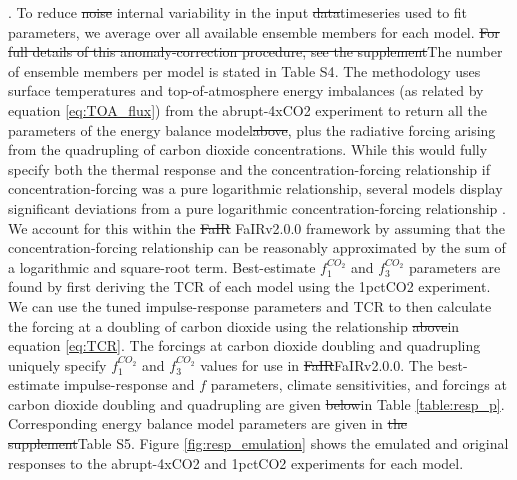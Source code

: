 \documentclass[gmd, manuscript]{copernicus}
\providecommand{\DIFadd}[1]{{\protect\color{blue}#1}} %
\providecommand{\DIFdel}[1]{{\protect\color{red}\sout{#1}}}                      %
\providecommand{\DIFaddbegin}{} %
\providecommand{\DIFaddend}{} %
\providecommand{\DIFdelbegin}{} %
\providecommand{\DIFdelend}{} %
\begin{document}
{}\DIFaddend . To reduce \DIFdelbegin \DIFdel{noise }\DIFdelend \DIFaddbegin \DIFadd{internal variability }\DIFaddend in the input \DIFdelbegin \DIFdel{data}\DIFdelend \DIFaddbegin \DIFadd{timeseries used to fit parameters}\DIFaddend , we average over all available ensemble members for each model. \DIFdelbegin \DIFdel{For full details of this anomaly-correction procedure, see the supplement}\DIFdelend \DIFaddbegin \DIFadd{The number of ensemble members per model is stated in Table S4}\DIFaddend . The \cite{Cummins2020} methodology uses surface temperatures and top-of-atmosphere energy imbalances \DIFaddbegin \DIFadd{(as related by equation \ref{eq:TOA_flux}) }\DIFaddend from the abrupt-4xCO2 experiment to return all the parameters of the energy balance model\DIFdelbegin \DIFdel{above}\DIFdelend , plus the radiative forcing arising from the quadrupling of carbon dioxide concentrations. While this would fully specify both the thermal response and the concentration-forcing relationship if concentration-forcing was a pure logarithmic relationship, several models display significant deviations from a pure logarithmic concentration-forcing relationship \citep{Tsutsui2020,Tsutsui2017}. We account for this within the \DIFdelbegin \DIFdel{FaIR }\DIFdelend \DIFaddbegin \DIFadd{FaIRv2.0.0 }\DIFaddend framework by assuming that the concentration-forcing relationship can be reasonably approximated by the sum of a logarithmic and square-root term. Best-estimate $f_1^{CO_2}$ and $f_3^{CO_2}$ parameters are found by first deriving the TCR of each model using the 1pctCO2 experiment. We can use the tuned impulse-response parameters and TCR to then calculate the forcing at a doubling of carbon dioxide using the relationship \DIFdelbegin \DIFdel{above}\DIFdelend \DIFaddbegin \DIFadd{in equation \ref{eq:TCR}}\DIFaddend . The forcings at carbon dioxide doubling and quadrupling uniquely specify $f_1^{CO_2}$ and $f_3^{CO_2}$ values for use in \DIFdelbegin \DIFdel{FaIR}\DIFdelend \DIFaddbegin \DIFadd{FaIRv2.0.0}\DIFaddend . The best-estimate impulse-response and \DIFaddbegin \DIFadd{$f$ parameters, climate sensitivities, and }\DIFaddend forcings at carbon dioxide doubling and quadrupling are given \DIFdelbegin \DIFdel{below}\DIFdelend \DIFaddbegin \DIFadd{in Table \ref{table:resp_p}}\DIFaddend . Corresponding energy balance model parameters are given in \DIFdelbegin \DIFdel{the supplement}\DIFdelend \DIFaddbegin \DIFadd{Table S5}\DIFaddend . Figure \ref{fig:resp_emulation} shows the emulated and original responses to the abrupt-4xCO2 and 1pctCO2 experiments for each model.
\DIFdelbegin %
\end{document}
